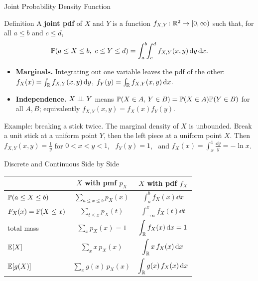 \begin{frame}{Joint Probability Density Function}
  \small
  \begin{block}{Definition}
    A \textbf{joint pdf} of $X$ and $Y$ is a function $f_{X,Y}\colon\mathbb{R}^2\to[0,\infty)$ such that, for all $a\le b$ and $c\le d$,
    \[
      \mathbb{P}(a\le X\le b,\ c\le Y\le d)=\int_a^b\!\!\int_c^d f_{X,Y}(x,y)\,\mathrm{d} y\,\mathrm{d} x .
    \]
  \end{block}
  \begin{itemize}
    \item \textbf{Marginals.} Integrating out one variable leaves the pdf of the other: $f_X(x)=\int_{\mathbb{R}}f_{X,Y}(x,y)\,\mathrm{d} y$, $f_Y(y)=\int_{\mathbb{R}}f_{X,Y}(x,y)\,\mathrm{d} x$.
    \item \textbf{Independence.} $X\perp\!\!\!\perp Y$ means $\mathbb{P}(X\in A,\,Y\in B)=\mathbb{P}(X\in A)\mathbb{P}(Y\in B)$ for all $A,B$; equivalently $f_{X,Y}(x,y)=f_X(x)f_Y(y)$.
  \end{itemize}
  \begin{block}{Example: breaking a stick twice. The marginal density of $X$ is unbounded.}
    Break a unit stick at a uniform point $Y$, then the left piece at a uniform point $X$. Then
    $f_{X,Y}(x,y)=\frac1y$ for $0<x<y<1$, \ $f_Y(y)=1$, \ and $f_X(x)=\int_x^1\frac{\dd y}{y}=-\ln x$.
  \end{block}
\end{frame}

\begin{frame}{Discrete and Continuous Side by Side}
  \begin{center}
    \renewcommand{\arraystretch}{1.6}
    \begin{tabular}{@{}lcc@{}}
      \toprule
        & \textbf{$X$ with pmf $p_X$} & \textbf{$X$ with pdf $f_X$} \\
      \midrule
      $\mathbb{P}(a\le X\le b)$ & $\displaystyle\sum_{a\le x\le b}p_X(x)$ & $\displaystyle\int_a^b f_X(x)\dd x$ \\
      $F_X(x)=\mathbb{P}(X\le x)$ & $\displaystyle\sum_{t\le x}p_X(t)$ & $\displaystyle\int_{-\infty}^x f_X(t)\dd t$ \\
      total mass & $\displaystyle\sum_x p_X(x)=1$ & $\displaystyle\int_{\mathbb{R}} f_X(x)\,\mathrm{d} x=1$ \\
      $\mathbb{E}[X]$ & $\displaystyle\sum_x x\,p_X(x)$ & $\displaystyle\int_{\mathbb{R}} x\,f_X(x)\,\mathrm{d} x$ \\
      $\mathbb{E}[g(X)]$ & $\displaystyle\sum_x g(x)\,p_X(x)$ & $\displaystyle\int_{\mathbb{R}} g(x)\,f_X(x)\,\mathrm{d} x$ \\
      \bottomrule
    \end{tabular}
  \end{center}
\end{frame}


